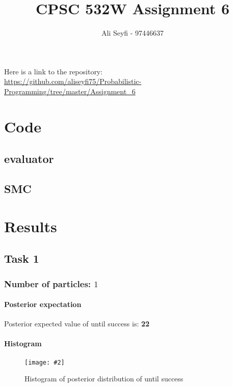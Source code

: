 \documentclass{article}
\newcommand{\centerfigcap}[3]{\begin{figure}[H]
\begin{center}\texttt{[image: \#2]} \caption{#3}\end{center}
\end{figure}}
\begin{document}
\title{\vspace{-20mm}
CPSC 532W Assignment 6}
\author{Ali Seyfi - 97446637}
\date{}
\maketitle

Here is a link to the repository:\\
\url{https://github.com/aliseyfi75/Probabilistic-Programming/tree/master/Assignment_6}


\section{Code}
\subsection{evaluator}
\label{evaluator}

\subsection{SMC}



\section{Results}
\subsection{Task 1}
\subsubsection{Number of particles: $1$}
\paragraph{Posterior expectation}
Posterior expected value of until success is: \textbf{22}\\

\paragraph{Histogram}
\centerfigcap{0.6}{../Figures/Histogram_1_0}{Histogram of posterior distribution of until success}
\end{document}
